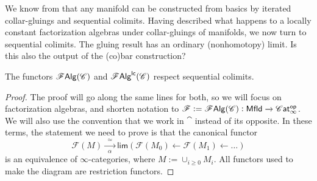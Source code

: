 \documentclass[../text]{subfiles}
\begin{document}
We know from  that any manifold can be constructed from basics by iterated collar-gluings and sequential colimits. Having described what happens to a locally constant factorization algebras under collar-gluings of manifolds, we now turn to sequential colimits. {\color{red} The gluing result has an ordinary (nonhomotopy) limit. Is this also the output of the (co)bar construction?}

\begin{proposition}\label{prop:fa_seq_col}
    The functors $\mathscr{F} \mathsf{Alg}(\mathscr{C})$ and $\mathscr{F} \mathsf{Alg}^{\mathsf{lc}}(\mathscr{C})$ respect sequential colimits.
\end{proposition}

\begin{proof}
    The proof will go along the same lines for both, so we will focus on factorization algebras, and shorten notation to $\mathscr{F} := \falg (\catC): \mfld[r] \xrightarrow{} \cat^{\mathsf{op}}$. We will also use the convention that we work in $\cat$ instead of its opposite. In these terms, the statement we need to prove is that the canonical functor
    \begin{equation}
        \mathscr{F}(M) \xrightarrow[\alpha]{\ \ \simeq \ \ } \mathsf{lim} (\mathscr{F}(M_0) \xleftarrow{} \mathscr{F}(M_1) \xleftarrow{} \dots)
    \end{equation}
    is an equivalence of $\infty$-categories, where $M := \cup_{i \geq 0} M_i$. All functors used to make the diagram are restriction functors. 


\end{proof}
\end{document}
